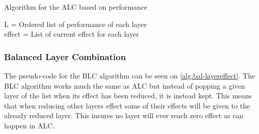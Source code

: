 \begin{algorithm}
    \caption{Algorithm for the ALC based on performance}
    \SetAlgoLined
    L = Ordered list of performance of each layer \\
    effect  = List of current effect for each layer \\
    \label{alg:aggresive-layereffect}
\end{algorithm}

\subsubsection{Balanced Layer Combination}
The pseudo-code for the BLC algorithm can be seen on \autoref{alg:bal-layereffect}.
The BLC algorithm works much the same as ALC but instead of popping a given layer of the list when its effect has been reduced, it is instead kept.
This means that when reducing other layers effect some of their effects will be given to the already reduced layer.
This insures no layer will ever reach zero effect as can happen in ALC.

